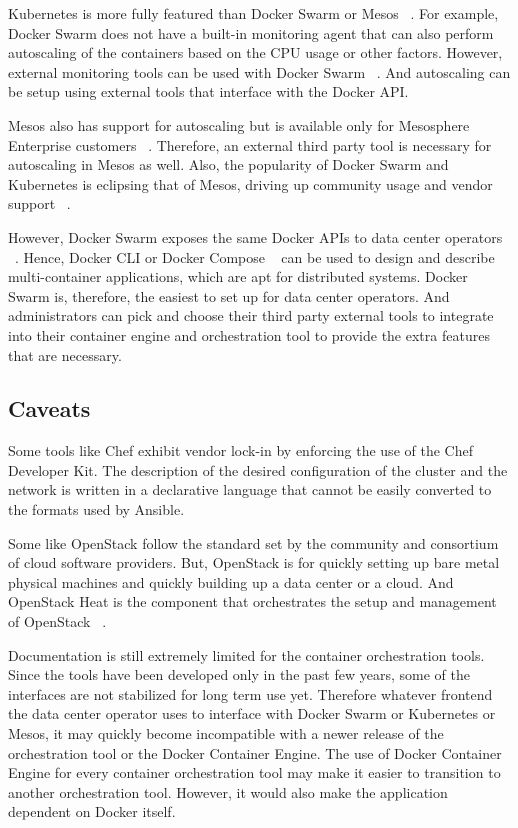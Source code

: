 \documentclass[10pt,twocolumn]{article}
\begin{document}
Kubernetes is more fully featured than Docker Swarm or Mesos ~\cite{kubernetes}.
For example, Docker Swarm does not have a built-in monitoring agent that can also perform autoscaling of the containers based on the CPU usage or other factors.
However, external monitoring tools can be used with Docker Swarm ~\cite{docker_swarm}.
And autoscaling can be setup using external tools that interface with the Docker API.

Mesos also has support for autoscaling but is available only for Mesosphere Enterprise customers ~\cite{mesosphere}.
Therefore, an external third party tool is necessary for autoscaling in Mesos as well.
Also, the popularity of Docker Swarm and Kubernetes is eclipsing that of Mesos, driving up community usage and vendor support ~\cite{openhub}.

However, Docker Swarm exposes the same Docker APIs to data center operators ~\cite{docker_swarm}.
Hence, Docker CLI or Docker Compose ~\cite{docker_compose} can be used to design and describe multi-container applications, which are apt for distributed systems.
Docker Swarm is, therefore, the easiest to set up for data center operators.
And administrators can pick and choose their third party external tools to integrate into their container engine and orchestration tool to provide the extra features that are necessary.

\subsection{Caveats}

Some tools like Chef exhibit vendor lock-in by enforcing the use of the Chef Developer Kit.
The description of the desired configuration of the cluster and the network is written in a declarative language that cannot be easily converted to the formats used by Ansible.

Some like OpenStack follow the standard set by the community and consortium of cloud software providers.
But, OpenStack is for quickly setting up bare metal physical machines and quickly building up a data center or a cloud.
And OpenStack Heat is the component that orchestrates the setup and management of OpenStack ~\cite{openstack}.

Documentation is still extremely limited for the container orchestration tools.
Since the tools have been developed only in the past few years, some of the interfaces are not stabilized for long term use yet.
Therefore whatever frontend the data center operator uses to interface with Docker Swarm or Kubernetes or Mesos, it may quickly become incompatible with a newer release of the orchestration tool or the Docker Container Engine.
The use of Docker Container Engine for every container orchestration tool may make it easier to transition to another orchestration tool.
However, it would also make the application dependent on Docker itself.
\end{document}
